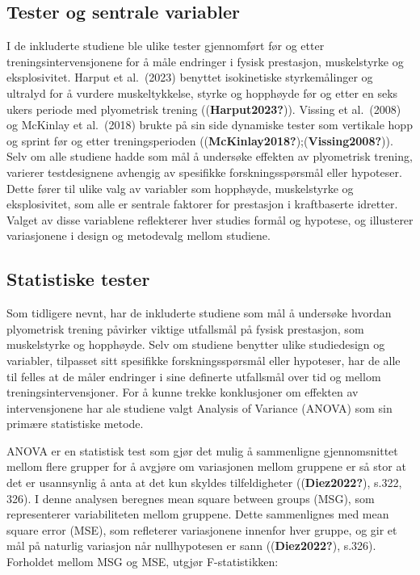 \documentclass[
  letterpaper,
  DIV=11,
  numbers=noendperiod]{scrreprt}
\begin{document}
\subsection{Tester og sentrale
variabler}\label{tester-og-sentrale-variabler}

I de inkluderte studiene ble ulike tester gjennomført før og etter
treningsintervensjonene for å måle endringer i fysisk prestasjon,
muskelstyrke og eksplosivitet. Harput et al.~(2023) benyttet
isokinetiske styrkemålinger og ultralyd for å vurdere muskeltykkelse,
styrke og hopphøyde før og etter en seks ukers periode med plyometrisk
trening ((\textbf{Harput2023?})). Vissing et al.~(2008) og McKinlay et
al.~(2018) brukte på sin side dynamiske tester som vertikale hopp og
sprint før og etter treningsperioden
((\textbf{McKinlay2018?});(\textbf{Vissing2008?})). Selv om alle
studiene hadde som mål å undersøke effekten av plyometrisk trening,
varierer testdesignene avhengig av spesifikke forskningsspørsmål eller
hypoteser. Dette fører til ulike valg av variabler som hopphøyde,
muskelstyrke og eksplosivitet, som alle er sentrale faktorer for
prestasjon i kraftbaserte idretter. Valget av disse variablene
reflekterer hver studies formål og hypotese, og illusterer variasjonene
i design og metodevalg mellom studiene.

\subsection{Statistiske tester}\label{statistiske-tester}

Som tidligere nevnt, har de inkluderte studiene som mål å undersøke
hvordan plyometrisk trening påvirker viktige utfallsmål på fysisk
prestasjon, som muskelstyrke og hopphøyde. Selv om studiene benytter
ulike studiedesign og variabler, tilpasset sitt spesifikke
forskningsspørsmål eller hypoteser, har de alle til felles at de måler
endringer i sine definerte utfallsmål over tid og mellom
treningsintervensjoner. For å kunne trekke konklusjoner om effekten av
intervensjonene har ale studiene valgt Analysis of Variance (ANOVA) som
sin primære statistiske metode.

ANOVA er en statistisk test som gjør det mulig å sammenligne
gjennomsnittet mellom flere grupper for å avgjøre om variasjonen mellom
gruppene er så stor at det er usannsynlig å anta at det kun skyldes
tilfeldigheter ((\textbf{Diez2022?}), s.322, 326). I denne analysen
beregnes mean square between groups (MSG), som representerer
variabiliteten mellom gruppene. Dette sammenlignes med mean square error
(MSE), som refleterer variasjonene innenfor hver gruppe, og gir et mål
på naturlig variasjon når nullhypotesen er sann ((\textbf{Diez2022?}),
s.326). Forholdet mellom MSG og MSE, utgjør F-statistikken:
\end{document}
